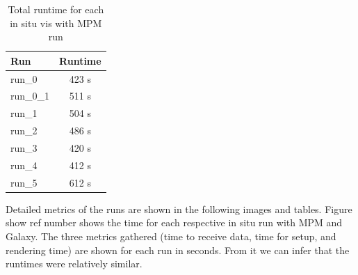 \documentclass{vgtc}
\begin{document}

\begin{table}[h!]
    \centering
    \caption{Total runtime for each in situ vis with MPM run}
    \label{tab:my_label}
    \begin{tabular}{l c} 
     \toprule
     Run & Runtime \\ 
     \midrule
     run\_0 & 423 s\\ 
     run\_0\_1 & 511 s \\ 
     run\_1 & 504 s\\ 
     run\_2 & 486 s\\ 
     run\_3 & 420 s \\ 
     run\_4 & 412 s \\ 
     run\_5 & 612 s \\ 
     \bottomrule
    \end{tabular}
\end{table}

Detailed metrics of the runs are shown in the following images and tables. Figure {show ref number} shows the time for each respective in situ run with MPM and Galaxy. The three metrics gathered (time to receive data, time for setup, and rendering time) are shown for each run in seconds. From it we can infer that the runtimes were relatively similar. 
\end{document}
